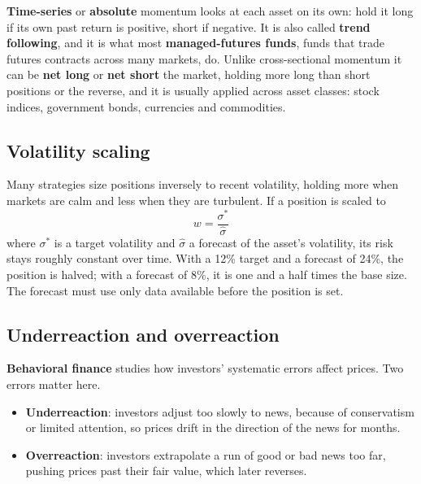 \textbf{Time-series} or \textbf{absolute} momentum looks at each asset on its own: hold it long if its own past return is positive, short if negative. It is also called \textbf{trend following}, and it is what most \textbf{managed-futures funds}, funds that trade futures contracts across many markets, do. Unlike cross-sectional momentum it can be \textbf{net long} or \textbf{net short} the market, holding more long than short positions or the reverse, and it is usually applied across asset classes: stock indices, government bonds, currencies and commodities.

\subsection{Volatility scaling}

Many strategies size positions inversely to recent volatility, holding more when markets are calm and less when they are turbulent. If a position is scaled to
\begin{equation}
  w = \frac{\sigma^*}{\hat\sigma}
  \label{eq:06-volscale}
\end{equation}
where $\sigma^*$ is a target volatility and $\hat\sigma$ a forecast of the asset's volatility, its risk stays roughly constant over time. With a 12\% target and a forecast of 24\%, the position is halved; with a forecast of 8\%, it is one and a half times the base size. The forecast must use only data available before the position is set.

\subsection{Underreaction and overreaction}
\label{sec:06-behavior}

\textbf{Behavioral finance} studies how investors' systematic errors affect prices. Two errors matter here.

\begin{itemize}
  \item \textbf{Underreaction}: investors adjust too slowly to news, because of conservatism or limited attention, so prices drift in the direction of the news for months.
  \item \textbf{Overreaction}: investors extrapolate a run of good or bad news too far, pushing prices past their fair value, which later reverses.
\end{itemize}

